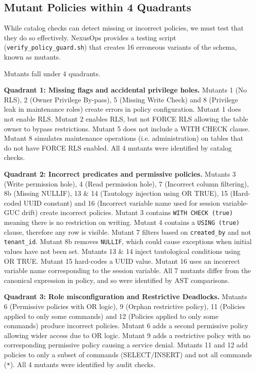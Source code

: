 \documentclass[conference]{IEEEtran}
\begin{document}
\subsection{Mutant Policies within 4 Quadrants}
While catalog checks can detect missing or incorrect policies, we must test that they do so effectively. NexusOps provides a testing script (\texttt{verify\_policy\_guard.sh}) that creates 16 erroneous variants of the schema, known as mutants.

Mutants fall under 4 quadrants.

\textbf{Quadrant 1: Missing flags and accidental privilege holes.} Mutants 1 (No RLS), 2 (Owner Privilege By-pass), 5 (Missing Write Check) and 8 (Privilege leak in maintenance roles) create errors in policy configuration. Mutant 1 does not enable RLS. Mutant 2 enables RLS, but not FORCE RLS allowing the table owner to bypass restrictions. Mutant 5 does not include a WITH CHECK clause. Mutant 8 simulates maintenance operations (i.e. administration) on tables that do not have FORCE RLS enabled. All 4 mutants were identified by catalog checks.

\textbf{Quadrant 2: Incorrect predicates and permissive policies.} Mutants 3 (Write permission hole), 4 (Read permission hole), 7 (Incorrect column filtering), 8b (Missing NULLIF), 13 \& 14 (Tautology injection using OR TRUE), 15 (Hard-coded UUID constant) and 16 (Incorrect variable name used for session variable-GUC drift) create incorrect policies. Mutant 3 contains \texttt{WITH CHECK (true)} meaning there is no restriction on writing. Mutant 4 contains a \texttt{USING (true)} clause, therefore any row is visible. Mutant 7 filters based on \texttt{created\_by} and not \texttt{tenant\_id}. Mutant 8b removes \texttt{NULLIF}, which could cause exceptions when initial values have not been set. Mutants 13 \& 14 inject tautological conditions using OR TRUE. Mutant 15 hard-codes a UUID value. Mutant 16 uses an incorrect variable name corresponding to the session variable. All 7 mutants differ from the canonical expression in policy, and so were identified by AST comparisons.

\textbf{Quadrant 3: Role misconfiguration and Restrictive Deadlocks.} Mutants 6 (Permissive policies with OR logic), 9 (Orphan restrictive policy), 11 (Policies applied to only some commands) and 12 (Policies applied to only some commands) produce incorrect policies. Mutant 6 adds a second permissive policy allowing wider access due to OR logic. Mutant 9 adds a restrictive policy with no corresponding permissive policy causing a service denial. Mutants 11 and 12 add policies to only a subset of commands (SELECT/INSERT) and not all commands (\texttt{*}). All 4 mutants were identified by audit checks.
\end{document}
